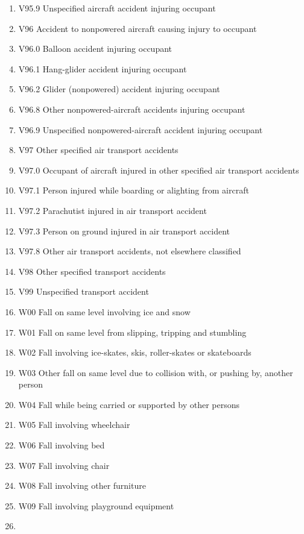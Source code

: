 \documentclass[
]{scrartcl}
\begin{document}
\begin{itemize}
\begin{enumerate}
  \item
    V95.9 Unspecified aircraft accident injuring occupant
  \item
    V96 Accident to nonpowered aircraft causing injury to occupant
  \item
    V96.0 Balloon accident injuring occupant
  \item
    V96.1 Hang-glider accident injuring occupant
  \item
    V96.2 Glider (nonpowered) accident injuring occupant
  \item
    V96.8 Other nonpowered-aircraft accidents injuring occupant
  \item
    V96.9 Unspecified nonpowered-aircraft accident injuring occupant
  \item
    V97 Other specified air transport accidents
  \item
    V97.0 Occupant of aircraft injured in other specified air transport
    accidents
  \item
    V97.1 Person injured while boarding or alighting from aircraft
  \item
    V97.2 Parachutist injured in air transport accident
  \item
    V97.3 Person on ground injured in air transport accident
  \item
    V97.8 Other air transport accidents, not elsewhere classified
  \item
    V98 Other specified transport accidents
  \item
    V99 Unspecified transport accident
  \item
    W00 Fall on same level involving ice and snow
  \item
    W01 Fall on same level from slipping, tripping and stumbling
  \item
    W02 Fall involving ice-skates, skis, roller-skates or skateboards
  \item
    W03 Other fall on same level due to collision with, or pushing by,
    another person
  \item
    W04 Fall while being carried or supported by other persons
  \item
    W05 Fall involving wheelchair
  \item
    W06 Fall involving bed
  \item
    W07 Fall involving chair
  \item
    W08 Fall involving other furniture
  \item
    W09 Fall involving playground equipment
  \item

\end{enumerate}
\end{itemize}
\end{document}

